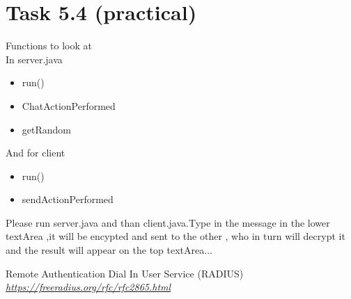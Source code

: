 \documentclass{article}
\begin{document}
\section *{Task 5.4 (practical)}
Functions to look at\\
In server.java
\begin{itemize}
\item run() 
\item ChatActionPerformed 
\item getRandom 
\end{itemize}
And for client
\begin{itemize}
\item run()\\
\item sendActionPerformed\\
\end{itemize}

Please run server.java and than client.java.Type in the message in the lower textArea ,it will be encypted and sent to the other , who in turn will decrypt it and the result will appear on the top textArea...

\begin{thebibliography}{9}

  Remote Authentication Dial In User Service (RADIUS)
  \emph{\url{https://freeradius.org/rfc/rfc2865.html}}
    
\end{thebibliography}
\end{document}
